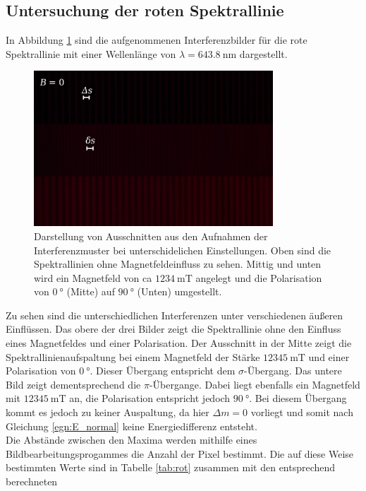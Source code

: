  \subsection{Untersuchung der roten Spektrallinie}
 In Abbildung \ref{fig:rot} sind die aufgenommenen Interferenzbilder für die rote Spektrallinie
 mit einer Wellenlänge von $\lambda = \SI{643.8}{\nano\meter}$ dargestellt.
 \begin{figure}[H]
     \centering
     \includegraphics[width=0.8\textwidth]{images/zebraplot_rot.jpg}
     \caption{Darstellung von Ausschnitten aus den Aufnahmen der Interferenzmuster bei unterschidelichen
     Einstellungen. Oben sind die Spektrallinien ohne Magnetfeldeinfluss zu sehen. Mittig und unten
     wird ein Magnetfeld von ca $\SI{1234}{\milli\tesla}$ angelegt und die Polarisation von $\SI{0}{\degree}$ (Mitte)
     auf $\SI{90}{\degree}$ (Unten) umgestellt.}
     \label{fig:rot}
 \end{figure} \noindent
 Zu sehen sind die unterschiedlichen Interferenzen unter verschiedenen äußeren Einflüssen. Das obere der drei
 Bilder zeigt die Spektrallinie ohne den Einfluss eines Magnetfeldes und einer Polarisation. Der Ausschnitt in
 der Mitte zeigt die Spektrallinienaufspaltung bei einem Magnetfeld der Stärke $\SI{12345}{\milli\tesla}$ und
 einer Polarisation von $\SI{0}{\degree}$. Dieser Übergang entspricht dem $\sigma$-Übergang. Das untere
 Bild zeigt dementsprechend die $\pi$-Übergange. Dabei liegt ebenfalls ein Magnetfeld mit $\SI{12345}{\milli\tesla}$
 an, die Polarisation entspricht jedoch $\SI{90}{\degree}$. Bei diesem Übergang kommt es jedoch zu keiner
 Auspaltung, da hier $\Delta m = 0$ vorliegt und somit nach Gleichung \ref{egn:E_normal} keine Energiedifferenz
 entsteht. \\
 Die Abstände zwischen den Maxima werden mithilfe eines Bildbearbeitungsprogammes die Anzahl der Pixel bestimmt.
 Die auf diese Weise bestimmten Werte sind in Tabelle \ref{tab:rot} zusammen mit den entsprechend berechneten
